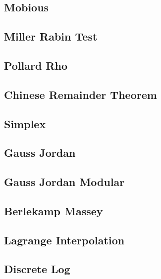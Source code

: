 \subsection{Mobious}
\raggedbottom
\hrulefill
\subsection{Miller Rabin Test}
\raggedbottom
\hrulefill
\subsection{Pollard Rho}
\raggedbottom
\hrulefill
\subsection{Chinese Remainder Theorem}
\raggedbottom
\hrulefill
\subsection{Simplex}
\raggedbottom
\hrulefill
\subsection{Gauss Jordan}
\raggedbottom
\hrulefill
\subsection{Gauss Jordan Modular}
\raggedbottom
\hrulefill
\subsection{Berlekamp Massey}
\raggedbottom
\hrulefill
\subsection{Lagrange Interpolation}
\raggedbottom
\hrulefill
\subsection{Discrete Log}
\raggedbottom
\hrulefill
